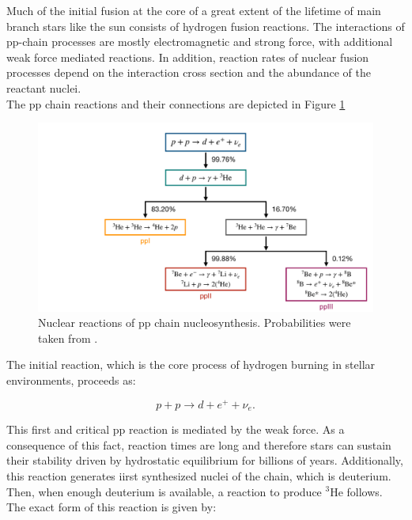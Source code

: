 \documentclass[openany]{book}
\begin{document}
Much of the initial fusion at the core of a great extent of the lifetime of main branch stars like the sun consists of hydrogen fusion reactions. The interactions of pp-chain processes are mostly electromagnetic and strong force, with additional weak force mediated reactions. In addition, reaction rates of nuclear fusion processes depend on the interaction cross section and the abundance of the reactant nuclei. \\

The pp chain reactions and their connections are depicted in Figure \ref{fig:nuclerReactionppChain}

\begin{figure}[H]
	\centering 
	\includegraphics[scale=0.25]{Graphs/ppchart.pdf}
	\caption[Nuclear reactions of pp chain nucleosynthesis]{Nuclear reactions of pp chain nucleosynthesis. Probabilities were taken from \cite{bertulani_kajino_2016}.}
	\label{fig:nuclerReactionppChain}
\end{figure}


The initial reaction, which is the core process of hydrogen burning in stellar environments, proceeds as:  

\begin{equation} \label{eq:reaction_ppMain}
	p + p \rightarrow d + e^{+} + \nu_e.
\end{equation}

This first and critical pp reaction is mediated by the weak force. As a consequence of this fact, reaction times are long and therefore stars can sustain their stability driven by hydrostatic equilibrium for billions of years. Additionally, this reaction generates iirst synthesized nuclei of the chain, which is deuterium. \\

Then, when enough deuterium is available, a reaction to produce ${}^{3} \mathrm{He}$ follows. The exact form of this reaction is given by: 
\end{document}
